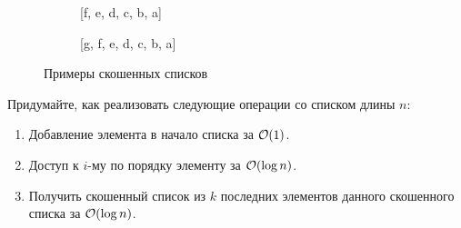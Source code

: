 \begin{enumerate}
\begin{figure}[H]
\begin{subfigure}[b]{0.3\textwidth}
        \caption{[f, e, d, c, b, a]}
      \end{subfigure}
      \hfill
      \begin{subfigure}[b]{0.3\textwidth}
        \centering
        \caption{[g, f, e, d, c, b, a]}
      \end{subfigure}
      \caption{Примеры скошенных списков}
    \end{figure}

    Придумайте, как реализовать следующие операции со списком длины
    $n$:
    \begin{enumerate}
      \item Добавление элемента в начало списка за $\mathcal{O}(1)$.
      \item Доступ к $i$-му по порядку элементу за $\mathcal{O}(\log{n})$.
      \item Получить скошенный список из $k$ последних элементов данного скошенного списка за $\mathcal{O}(\log{n})$.
    \end{enumerate}


\end{enumerate}
